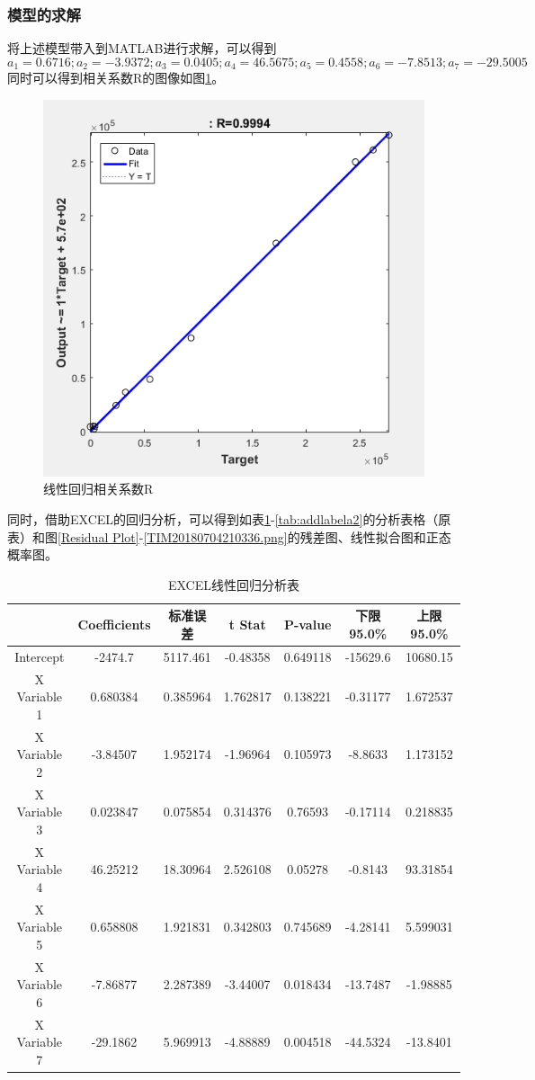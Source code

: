 \documentclass[12pt]{article}%
\begin{document}
\subsubsection{模型的求解}
将上述模型带入到MATLAB进行求解，可以得到
$$a_1=0.6716;a_2=-3.9372;a_3=0.0405;a_4=46.5675 ;a_5=0.4558;a_6= -7.8513;a_7=-29.5005
$$
同时可以得到相关系数R的图像如图\ref{TIM20180704170021}。
\begin{figure}[hbp]
  \centering
  \includegraphics[width=.5\textwidth]{TIM20180704170021.png} %
  \caption{线性回归相关系数R} 
  \label{TIM20180704170021} 
\end{figure}

同时，借助EXCEL的回归分析，可以得到如表\ref{tab:addlabela1}-\ref{tab:addlabela2}的分析表格（原表）和图\ref{Residual Plot}-\ref{TIM20180704210336.png}的残差图、线性拟合图和正态概率图。
\begin{table}[htbp]
  \centering
  \caption{EXCEL线性回归分析表}
    \begin{tabular}{ccccccc}
    \hline
       & Coefficients & 标准误差 & t Stat & P-value & 下限 95.0\% & 上限 95.0\% \bigstrut\\
    \hline
    Intercept & -2474.7 & 5117.461 & -0.48358 & 0.649118 & -15629.6 & 10680.15 \bigstrut[t]\\
    X Variable 1 & 0.680384 & 0.385964 & 1.762817 & 0.138221 & -0.31177 & 1.672537 \\
    X Variable 2 & -3.84507 & 1.952174 & -1.96964 & 0.105973 & -8.8633 & 1.173152 \\
    X Variable 3 & 0.023847 & 0.075854 & 0.314376 & 0.76593 & -0.17114 & 0.218835 \\
    X Variable 4 & 46.25212 & 18.30964 & 2.526108 & 0.05278 & -0.8143 & 93.31854 \\
    X Variable 5 & 0.658808 & 1.921831 & 0.342803 & 0.745689 & -4.28141 & 5.599031 \\
    X Variable 6 & -7.86877 & 2.287389 & -3.44007 & 0.018434 & -13.7487 & -1.98885 \\
    X Variable 7 & -29.1862 & 5.969913 & -4.88889 & 0.004518 & -44.5324 & -13.8401 \bigstrut[b]\\
    \hline
    \end{tabular}%
  \label{tab:addlabela1}%
\end{table}%
\end{document}
